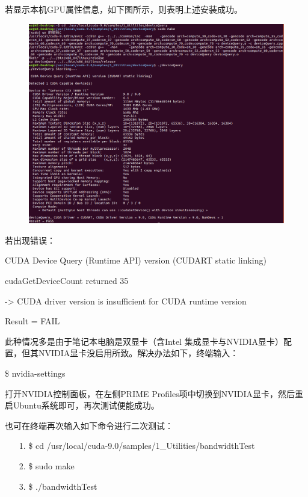 \documentclass[11pt,a4paper]{ctexart}
\begin{document}
\newpage

若显示本机GPU属性信息，如下图所示，则表明上述安装成功。
\begin{figure}[h]
\begin{center}
\includegraphics[width=\textwidth]{test1} 
\end{center}
\end{figure}

\vspace{-0.2cm}
\noindent 若出现错误：

CUDA Device Query (Runtime API) version (CUDART static linking)

cudaGetDeviceCount returned 35 

-> CUDA driver version is insufficient for CUDA runtime version 

Result = FAIL

此种情况多是由于笔记本电脑是双显卡（含Intel 集成显卡与NVIDIA显卡）配置，但其NVIDIA显卡没启用所致。解决办法如下，终端输入：
\vspace{-0.2cm}
\begin{center}
\$ nvidia-settings
\end{center}
打开NVIDIA控制面板，在左侧PRIME Profiles项中切换到NVIDIA显卡，然后重启Ubuntu系统即可，再次测试便能成功。



也可在终端再次输入如下命令进行二次测试：
\vspace{-0.2cm}
\begin{itemize}
\item[1.] \$ cd  /usr/local/cuda-9.0/samples/1\_Utilities/bandwidthTest
\item[2.] \$ sudo make
\item[3.] \$ ./bandwidthTest
\end{itemize}
\end{document}
